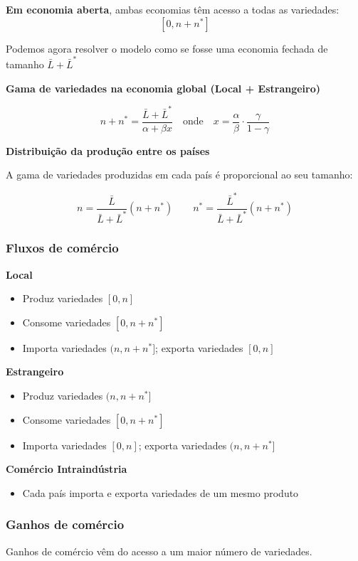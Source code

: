 \documentclass[a4paper,12pt]{article}[abntex2]
\begin{document}
\textbf{Em economia aberta}, ambas economias têm acesso a todas as variedades:
\[
[0, n + n^*]
\]

Podemos agora resolver o modelo como se fosse uma economia fechada de tamanho \(\bar{L} + \bar{L}^*\)

\textbf{Gama de variedades na economia global (Local + Estrangeiro)}

\[
n + n^* = \frac{\bar{L} + \bar{L}^*}{\alpha + \beta x}
\quad \text{onde} \quad
x = \frac{\alpha}{\beta} \cdot \frac{\gamma}{1 - \gamma}
\]

\textbf{Distribuição da produção entre os países}

A gama de variedades produzidas em cada país é proporcional ao seu tamanho:

\[
n = \frac{\bar{L}}{\bar{L} + \bar{L}^*}(n + n^*)
\qquad
n^* = \frac{\bar{L}^*}{\bar{L} + \bar{L}^*}(n + n^*)
\]

\subsubsection{\textbf{Fluxos de comércio}}
\textbf{Local}
\begin{itemize}
    \item Produz variedades \([0, n]\)
    \item Consome variedades \([0, n + n^*]\)
    \item Importa variedades \((n, n + n^*]\); exporta variedades \([0, n]\)
\end{itemize}

\textbf{Estrangeiro}
\begin{itemize}
    \item Produz variedades \((n, n + n^*]\)
    \item Consome variedades \([0, n + n^*]\)
    \item Importa variedades \([0, n]\); exporta variedades \((n, n + n^*]\)
\end{itemize}

\textbf{Comércio Intraindústria}
\begin{itemize}
    \item Cada país importa e exporta variedades de um mesmo produto
\end{itemize}

\subsubsection{\textbf{Ganhos de comércio}}

Ganhos de comércio vêm do acesso a um maior número de variedades.
\end{document}
